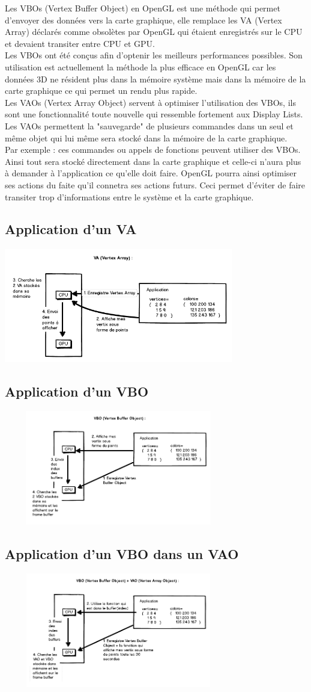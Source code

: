 
Les VBOs (Vertex Buffer Object) en OpenGL est une méthode qui permet d'envoyer des données vers la carte graphique, elle remplace les VA (Vertex Array) déclarés comme obsolètes par OpenGL qui étaient enregistrés sur le CPU et devaient transiter entre CPU et GPU.\\
Les VBOs ont été conçus afin d'optenir les meilleurs performances possibles. Son utilisation est actuellement la méthode la plus efficace en OpenGL car les données 3D ne résident plus dans la mémoire système mais dans la mémoire de la carte graphique ce qui permet un rendu plus rapide.\\
Les VAOs (Vertex Array Object) servent à optimiser l'utilisation des VBOs, ils sont une fonctionnalité toute nouvelle qui ressemble fortement aux Display Lists. Les VAOs permettent la "sauvegarde" de plusieurs commandes dans un seul et même objet qui lui même sera stocké dans la mémoire de la carte graphique. \\
Par exemple : ces commandes ou appels de fonctions peuvent utiliser des VBOs. Ainsi tout sera stocké directement dans la carte graphique et celle-ci n'aura plus à demander à l'application ce qu'elle doit faire. OpenGL pourra ainsi optimiser ses actions du faite qu'il connetra ses actions futurs. Ceci permet d'éviter de faire transiter trop d'informations entre le système et la carte graphique.
\subsection{Application d'un VA}
\includegraphics[width=10cm,height=5cm]{img/VA.png}
\subsection{Application d'un VBO}
\includegraphics[width=10cm,height=5cm]{img/VBO.png}
\subsection{Application d'un VBO dans un VAO}
\includegraphics[width=10cm,height=5cm]{img/VAO_VBO.png}
